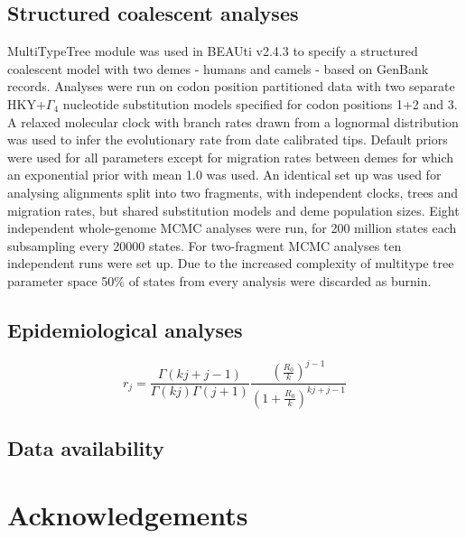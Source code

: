 \documentclass[11pt,oneside,letterpaper]{article}
\begin{document}
\subsection*{Structured coalescent analyses}
MultiTypeTree module \citep{vaughan_efficient_2014} was used in BEAUti v2.4.3 \citep{bouckaert_beast_2014} to specify a structured coalescent model with two demes - humans and camels - based on GenBank records.
Analyses were run on codon position partitioned data with two separate HKY+$\Gamma_{4}$ \citep{hky_1985,yang_1994} nucleotide substitution models specified for codon positions 1+2 and 3.
A relaxed molecular clock with branch rates drawn from a lognormal distribution \citep{drummond_2006} was used to infer the evolutionary rate from date calibrated tips.
Default priors were used for all parameters except for migration rates between demes for which an exponential prior with mean 1.0 was used.
An identical set up was used for analysing alignments split into two fragments, with independent clocks, trees and migration rates, but shared substitution models and deme population sizes.
Eight independent whole-genome MCMC analyses were run, for 200 million states each subsampling every 20000 states.
For two-fragment MCMC analyses ten independent runs were set up.
Due to the increased complexity of multitype tree parameter space 50\% of states from every analysis were discarded as burnin.

\subsection*{Epidemiological analyses}


\begin{equation}
r_{j} = \frac{\Gamma(kj+j-1)}{\Gamma(kj)\Gamma(j+1)} \frac{(\frac{R_{0}}{k})^{j-1}}{(1+\frac{R_{0}}{k})^{kj+j-1}}
\end{equation}

\subsection*{Data availability}


\section*{Acknowledgements}



\end{document}
